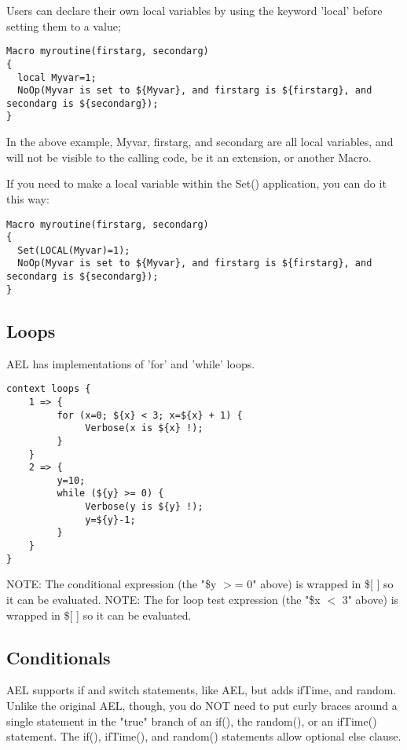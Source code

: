 {Users can declare their own local variables by using the keyword 'local'
before setting them to a value;

\begin{verbatim}
Macro myroutine(firstarg, secondarg)
{
  local Myvar=1;
  NoOp(Myvar is set to ${Myvar}, and firstarg is ${firstarg}, and secondarg is ${secondarg});
}
\end{verbatim}

In the above example, Myvar, firstarg, and secondarg are all local variables,
and will not be visible to the calling code, be it an extension, or another Macro.

If you need to make a local variable within the Set() application, you can do it this way:

\begin{verbatim}
Macro myroutine(firstarg, secondarg)
{
  Set(LOCAL(Myvar)=1);
  NoOp(Myvar is set to ${Myvar}, and firstarg is ${firstarg}, and secondarg is ${secondarg});
}
\end{verbatim}


\subsection{Loops}

AEL has implementations of 'for' and 'while' loops.

\begin{verbatim}
context loops {
    1 => {
         for (x=0; ${x} < 3; x=${x} + 1) {
              Verbose(x is ${x} !);
         }
    }
    2 => {
         y=10;
         while (${y} >= 0) {
              Verbose(y is ${y} !);
              y=${y}-1;
         }
    }
}
\end{verbatim}

NOTE: The conditional expression (the "\${y} $>$= 0" above) is wrapped in
      \$[ ] so it can be evaluated.  NOTE: The for loop test expression
      (the "\${x} $<$ 3" above) is wrapped in \$[ ] so it can be evaluated.



\subsection{Conditionals}

AEL supports if and switch statements, like AEL, but adds ifTime, and
random. Unlike the original AEL, though, you do NOT need to put curly
braces around a single statement in the "true" branch of an if(), the
random(), or an ifTime() statement. The if(), ifTime(), and random()
statements allow optional else clause.

}

